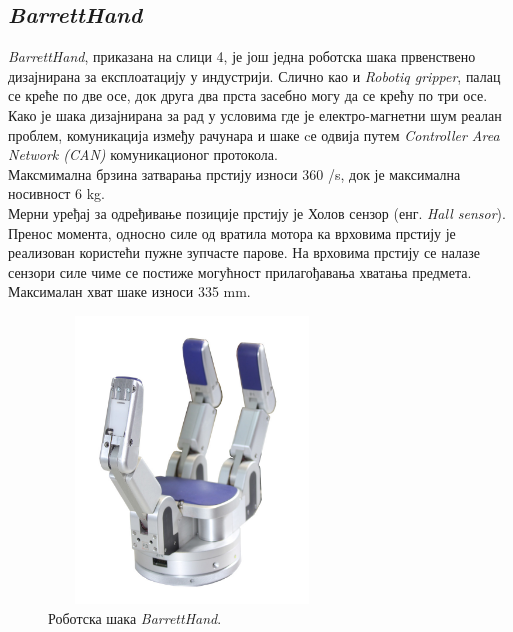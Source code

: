\documentclass{article}
\begin{document}
\subsection{\textit{BarrettHand}} 
\textit{BarrettHand}, приказана на слици 4, је још једна роботска шака првенствено дизајнирана за експлоатацију у индустрији. 
Слично као и \textit{Robotiq gripper}, палац се креће по две осе, док друга два прста засебно могу да
се крећу по три осе. \\Како је шака дизајнирана
за рад у условима где је електро-магнетни шум реалан проблем, комуникација између рачунара и шаке cе одвија путем \textit{Controller Area Network (CAN)} \cite{can}
комуникационог протокола. \\
Максмимална брзина затварања прстију износи 360 \degree/s, док је максимална носивност 6 kg. \\
Мерни уређај за одређивање позиције прстију је Холов сензор (енг. \textit{Hall sensor}). Пренос момента, односно силе од вратила мотора ка 
врховима прстију је реализован користећи пужне зупчасте парове. На врховима прстију се налазе сензори силе чиме се постиже 
могућност прилагођавања хватања предмета. Максималан хват шаке износи 335 mm. \cite{barret}
\begin{figure}[H]
\centering
\includegraphics[width=3in, height=3in]{Images/Saka3.jpg}
\caption{Роботска шака \textit{BarrettHand}. \cite{barret}}
\label{fig:figure4}
\end{figure}
\end{document}

